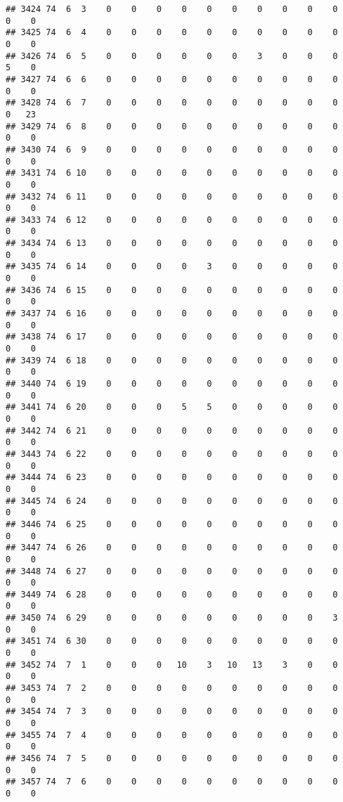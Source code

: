 \documentclass[]{article}
\begin{document}
\begin{verbatim}
## 3424 74  6  3    0    0    0    0    0    0    0    0    0    0    0    0
## 3425 74  6  4    0    0    0    0    0    0    0    0    0    0    0    0
## 3426 74  6  5    0    0    0    0    0    0    3    0    0    0    5    0
## 3427 74  6  6    0    0    0    0    0    0    0    0    0    0    0    0
## 3428 74  6  7    0    0    0    0    0    0    0    0    0    0    0   23
## 3429 74  6  8    0    0    0    0    0    0    0    0    0    0    0    0
## 3430 74  6  9    0    0    0    0    0    0    0    0    0    0    0    0
## 3431 74  6 10    0    0    0    0    0    0    0    0    0    0    0    0
## 3432 74  6 11    0    0    0    0    0    0    0    0    0    0    0    0
## 3433 74  6 12    0    0    0    0    0    0    0    0    0    0    0    0
## 3434 74  6 13    0    0    0    0    0    0    0    0    0    0    0    0
## 3435 74  6 14    0    0    0    0    3    0    0    0    0    0    0    0
## 3436 74  6 15    0    0    0    0    0    0    0    0    0    0    0    0
## 3437 74  6 16    0    0    0    0    0    0    0    0    0    0    0    0
## 3438 74  6 17    0    0    0    0    0    0    0    0    0    0    0    0
## 3439 74  6 18    0    0    0    0    0    0    0    0    0    0    0    0
## 3440 74  6 19    0    0    0    0    0    0    0    0    0    0    0    0
## 3441 74  6 20    0    0    0    5    5    0    0    0    0    0    0    0
## 3442 74  6 21    0    0    0    0    0    0    0    0    0    0    0    0
## 3443 74  6 22    0    0    0    0    0    0    0    0    0    0    0    0
## 3444 74  6 23    0    0    0    0    0    0    0    0    0    0    0    0
## 3445 74  6 24    0    0    0    0    0    0    0    0    0    0    0    0
## 3446 74  6 25    0    0    0    0    0    0    0    0    0    0    0    0
## 3447 74  6 26    0    0    0    0    0    0    0    0    0    0    0    0
## 3448 74  6 27    0    0    0    0    0    0    0    0    0    0    0    0
## 3449 74  6 28    0    0    0    0    0    0    0    0    0    0    0    0
## 3450 74  6 29    0    0    0    0    0    0    0    0    0    3    0    0
## 3451 74  6 30    0    0    0    0    0    0    0    0    0    0    0    0
## 3452 74  7  1    0    0    0   10    3   10   13    3    0    0    0    0
## 3453 74  7  2    0    0    0    0    0    0    0    0    0    0    0    0
## 3454 74  7  3    0    0    0    0    0    0    0    0    0    0    0    0
## 3455 74  7  4    0    0    0    0    0    0    0    0    0    0    0    0
## 3456 74  7  5    0    0    0    0    0    0    0    0    0    0    0    0
## 3457 74  7  6    0    0    0    0    0    0    0    0    0    0    0    0

\end{verbatim}
\end{document}
